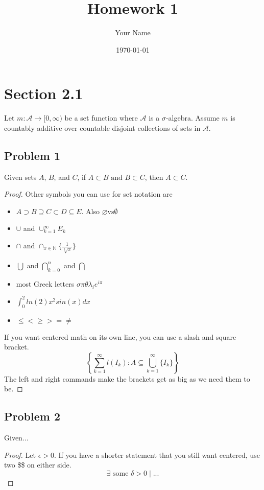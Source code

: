 \documentclass{article}
\title{Homework 1}
\author{Your Name}
\date\today
\begin{document}
\maketitle %

\section*{Section 2.1}
Let $m:\mathcal{A}\rightarrow [0,\infty)$ be a set function where $\mathcal{A}$ is a $\sigma$-algebra. Assume $m$ is countably additive over countable disjoint collections of sets in $\mathcal{A}$.

\subsection*{Problem 1}
Given sets $A$, $B$, and $C$, if $A\subset B \textrm{ and } B \subset C$, then $A \subset C$.
\begin{proof}
Other symbols you can use for set notation are
\begin{itemize}
\item$A \supset B \supseteq C \subset D \subseteq E$. Also $\varnothing \textrm{vs} \emptyset$
\item$\cup$ and $\cup_{k=1}^\infty E_k$
\item$\cap$ and $\cap_{x \in \mathbb{N}} \{\frac{1}{\sqrt[3]{x}}\}$
\item$\bigcup$ and $\bigcap\limits_{k=0}^n$ and $\bigcap$
\item most Greek letters $\sigma \pi \theta \lambda_i e^{i\pi}$
\item $\int_0^2 ln(2)x^2sin(x) dx$
\item$\leq < \geq > = \neq$
\end{itemize}
If you want centered math on its own line, you can use a slash and square bracket.\\
\[
\left \{
\sum\limits_{k=1}^\infty l(I_k):A\subseteq \bigcup_{k=1}^\infty \{I_k\}
\right \}
\]
The left and right commands make the brackets get as big as we need them to be.
\end{proof}

\clearpage %
\subsection*{Problem 2}
Given...
\begin{proof}
Let $\epsilon>0$.
If you have a shorter statement that you still want centered, use two \$\$ on either side.
$$\exists \textrm{ some } \delta>0 \mid ...$$
\end{proof}
\end{document}
